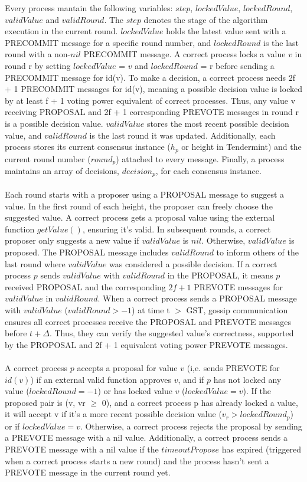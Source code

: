 \documentclass{article}
\begin{document}
	Every process mantain the following variables: $step$, $lockedValue$, $lockedRound$, $validValue$ and $validRound$. The $step$ denotes the stage of the algorithm execution in the current round. $lockedValue$ holds the latest value sent with a PRECOMMIT message for a specific round number, and $lockedRound$ is the last round with a non-$nil$ PRECOMMIT message. A correct process locks a value $v$ in round r by setting $lockedValue$ = $v$ and $lockedRound$ = r before sending a PRECOMMIT message for id(v). To make a decision, a correct process needs 2f + 1 PRECOMMIT messages for id(v), meaning a possible decision value is locked by at least f + 1 voting power equivalent of correct processes. Thus, any value v receiving PROPOSAL and 2f + 1 corresponding PREVOTE messages in round r is a possible decision value. $validValue$ stores the most recent possible decision value, and $validRound$ is the last round it was updated. Additionally, each process stores its current consensus instance ($h_p$ or height in Tendermint) and the current round number ($round_p$) attached to every message. Finally, a process maintains an array of decisions, $decision_p$, for each consensus instance. \\ \\	
	Each round starts with a proposer using a PROPOSAL message to suggest a value. In the first round of each height, the proposer can freely choose the suggested value. A correct process gets a proposal value using the external function $getValue()$, ensuring it's valid. In subsequent rounds, a correct proposer only suggests a new value if $validValue$ is $nil$. Otherwise, $validValue$ is proposed. The PROPOSAL message includes $validRound$ to inform others of the last round where $validValue$ was considered a possible decision. If a correct process $p$ sends $validValue$ with $validRound$ in the PROPOSAL, it means $p$ received PROPOSAL and the corresponding $2f + 1$ PREVOTE messages for $validValue$ in $validRound$. When a correct process sends a PROPOSAL message with $validValue$ ($validRound > -1$) at time t $>$ GST, gossip communication ensures all correct processes receive the PROPOSAL and PREVOTE messages before $t + \Delta$. Thus, they can verify the suggested value's correctness, supported by the PROPOSAL and 2f + 1 equivalent voting power PREVOTE messages. \\ \\
	A correct process $p$ accepts a proposal for value $v$ (i,e. sends PREVOTE for $id(v)$) if an external valid function approves $v$, and if $p$ has not locked any value ($lockedRound = -1 $) or has locked value $v$ ($lockedValue = v$). If the proposed pair is (v, vr $\geq$ 0), and a correct process p has already locked a value, it will accept v if it's a more recent possible decision value ($v_r > lockedRound_p$) or if $lockedValue = v$. Otherwise, a correct process rejects the proposal by sending a PREVOTE message with a nil value. Additionally, a correct process sends a PREVOTE message with a nil value if the $timeoutPropose$ has expired (triggered when a correct process starts a new round) and the process hasn't sent a PREVOTE message in the current round yet.\\ \\
\end{document}
